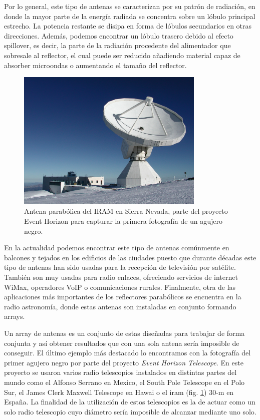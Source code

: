 \par Por lo general, este tipo de antenas se caracterizan por su patrón de radiación, en donde la mayor parte de la energía radiada se concentra sobre un lóbulo principal estrecho. La potencia restante se disipa en forma de lóbulos secundarios en otras direcciones. Además, podemos encontrar un lóbulo trasero debido al efecto spillover, es decir, la parte de la radiación procedente del alimentador que sobresale al reflector, el cual puede ser reducido añadiendo material capaz de absorber microondas o aumentando el tamaño del reflector. 


\begin{figure}[h]
    \centering
        \includegraphics[width=0.8\textwidth]{archivos/parab}
        \caption{Antena parabólica del IRAM en Sierra Nevada, parte del proyecto Event Horizon para capturar la primera fotografía de un agujero negro. \cite{MICIU2019}}
        \label{fig:parabolica}
\end{figure}

\par En la actualidad podemos encontrar este tipo de antenas comúnmente en balcones y tejados en los edificios de las ciudades puesto que durante décadas este tipo de antenas han sido usadas para la recepción de televisión por satélite. También son muy usadas para radio enlaces, ofreciendo servicios de internet WiMax, operadores VoIP o comunicaciones rurales. Finalmente, otra de las aplicaciones más importantes de los reflectores parabólicos se encuentra en la radio astronomía, donde estas antenas son instaladas en conjunto formando arrays. 
\\
\par Un array de antenas es un conjunto de estas diseñadas para trabajar de forma conjunta y así obtener resultados que con una sola antena sería imposible de conseguir. El último ejemplo más destacado lo encontramos con la fotografía del primer agujero negro por parte del proyecto \textit{Event Horizon Telescope}. En este proyecto se usaron varios radio telescopios instalados en distintas partes del mundo como el Alfonso Serrano en Mexico, el South Pole Telescope en el Polo Sur, el James Clerk Maxwell Telescope en Hawai o el \gls{iram} (fig. \ref{fig:parabolica}) 30-m en España. La finalidad de la utilización de estos telescopios es la de actuar como un solo radio telescopio cuyo diámetro sería imposible de alcanzar mediante uno solo.

